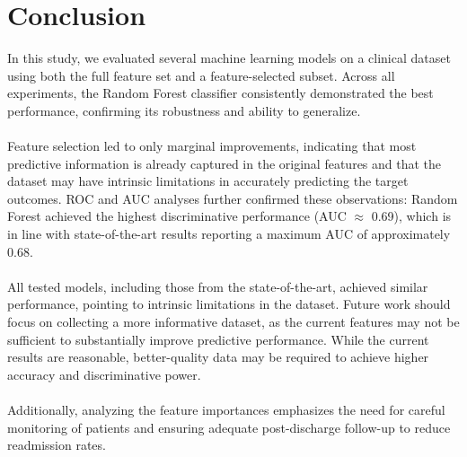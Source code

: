 \section{Conclusion}

In this study, we evaluated several machine learning models on a clinical dataset using both the full feature set and a feature-selected subset. Across all experiments, the Random Forest classifier consistently demonstrated the best performance, confirming its robustness and ability to generalize.\\\\
Feature selection led to only marginal improvements, indicating that most predictive information is already captured in the original features and that the dataset may have intrinsic limitations in accurately predicting the target outcomes. ROC and AUC analyses further confirmed these observations: Random Forest achieved the highest discriminative performance (AUC $\approx$ 0.69), which is in line with state-of-the-art results reporting a maximum AUC of approximately 0.68.\\\\
All tested models, including those from the state-of-the-art, achieved similar performance, pointing to intrinsic limitations in the dataset. Future work should focus on collecting a more informative dataset, as the current features may not be sufficient to substantially improve predictive performance. While the current results are reasonable, better-quality data may be required to achieve higher accuracy and discriminative power.\\\\
Additionally, analyzing the feature importances emphasizes the need for careful monitoring of patients and ensuring adequate post-discharge follow-up to reduce readmission rates. 
